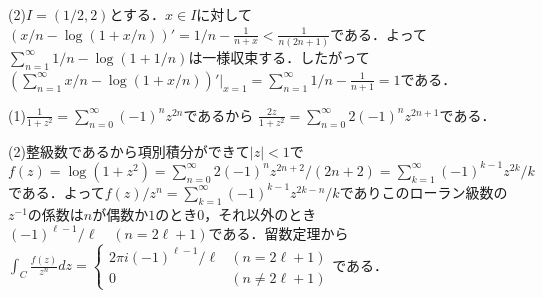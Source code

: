 \documentclass[
		book,
		head_space=20mm,
		foot_space=20mm,
		gutter=10mm,
		line_length=190mm
]{jlreq}
\begin{document}
(2)$I=(1/2,2)$とする．$x\in I$に対して
$(x/n-\log(1+x/n))'=1/n-\frac{1}{n+x}<\frac{1}{n(2n+1)}$である．よって$\sum\limits_{n=1}^{\infty}1/n-\log(1+1/n)$は一様収束する．したがって
$(\sum\limits_{n=1}^\infty x/n-\log(1+x/n))'|_{x=1}=\sum\limits_{n=1}^\infty 1/n-\frac{1}{n+1}=1$である．

(1)$\frac{1}{1+z^2}=\sum\limits_{n=0}^\infty(-1)^nz^{2n}$であるから
$\frac{2z}{1+z^2}=\sum\limits_{n=0}^\infty2(-1)^nz^{2n+1}$である．

(2)整級数であるから項別積分ができて$|z|<1$で
$f(z)=\log(1+z^2)=\sum\limits_{n=0}^\infty2(-1)^{n}z^{2n+2}/(2n+2)=\sum\limits_{k=1}^\infty(-1)^{k-1}z^{2k}/k$である．よって$f(z)/z^n=\sum\limits_{k=1}^\infty(-1)^{k-1}z^{2k-n}/k$でありこのローラン級数の$z^{-1}$の係数は$n$が偶数か$1$のとき$0$，それ以外のとき$(-1)^{\ell-1}/\ell \quad (n=2\ell+1)$である．留数定理から$\int_C\frac{f(z)}{z^n}dz=\begin{cases} 2\pi i(-1)^{\ell-1}/\ell & (n=2\ell+1) \\ 0 & (n\neq 2\ell+1) \end{cases}$である．
\end{document}
